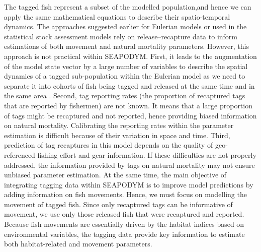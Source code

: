 The tagged fish represent a subset of the modelled population,and hence we can apply the same mathematical equations to describe their spatio-temporal dynamics. The approaches suggested earlier for Eulerian models \citep{Sibert} or used in the statistical stock assessment models \citep*[see e.g.,][]{Hampton-Fournier} rely on release--recapture data to inform estimations of both movement and natural mortality parameters. However, this approach is not practical within SEAPODYM. First, it leads to the augmentation of the model state vector by a large number of variables to describe the spatial dynamics of a tagged sub-population within the Eulerian model as we need to separate it into cohorts of fish being tagged and released at the same time and in the same area \citep{Sibert}. Second, tag reporting rates (the proportion of recaptured tags that are reported by fishermen) are not known. It means that a large proportion of tags might be recaptured and not reported, hence providing biased information on natural mortality. Calibrating the reporting rates within the parameter estimation is difficult because of their variation in space and time. Third, prediction of tag recaptures in this model depends on the quality of geo-referenced fishing effort and gear information. If these difficulties are not properly addressed, the information provided by tags on natural mortality may not ensure unbiased parameter estimation. At the same time, the main objective of integrating tagging data within SEAPODYM is to improve model predictions by adding information on fish movements. Hence, we must focus on modelling the movement of tagged fish. Since only recaptured tags can be informative of movement, we use only those released fish that were recaptured and reported. Because fish movements are essentially driven by the habitat indices based on environmental variables, the tagging data provide key information to estimate both habitat-related and movement parameters. 

